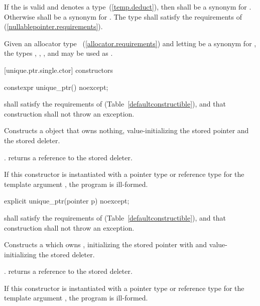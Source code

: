 \pnum
If the   is valid and denotes a
type~(\ref{temp.deduct}), then  shall be a synonym for . Otherwise
 shall be a synonym for . The type  shall
satisfy the requirements of  (\ref{nullablepointer.requirements}).

\pnum
\enterexample Given an allocator type ~(\ref{allocator.requirements}) and
letting  be a synonym for , the types ,
, , and 
may be used as . \exitexample

[unique.ptr.single.ctor]{ constructors}

\begin{itemdecl}
constexpr unique_ptr() noexcept;
\end{itemdecl}

\begin{itemdescr}
\pnum
\requires {} shall
satisfy the requirements of  (Table~\ref{defaultconstructible}),
and that construction shall not throw an exception.

\pnum
\effects Constructs a  object that owns
nothing, value-initializing the stored pointer and the stored deleter.

\pnum
\postconditions {}. 
returns a reference to the stored deleter.

\pnum
\remarks If this constructor is instantiated with a pointer type or reference type
for the template argument , the program is ill-formed.
\end{itemdescr}

\begin{itemdecl}
explicit unique_ptr(pointer p) noexcept;
\end{itemdecl}

\begin{itemdescr}
\pnum
\requires {} shall
satisfy the requirements of  (Table~\ref{defaultconstructible}),
and that construction shall not throw an exception.

\pnum
\effects Constructs a  which owns
, initializing the stored pointer with  and
value-initializing the stored deleter.

\pnum
\postconditions {}. 
returns a reference to the stored deleter.

\pnum
\remarks If this constructor is instantiated with a pointer type or reference type
for the template argument , the program is ill-formed.
\end{itemdescr}

